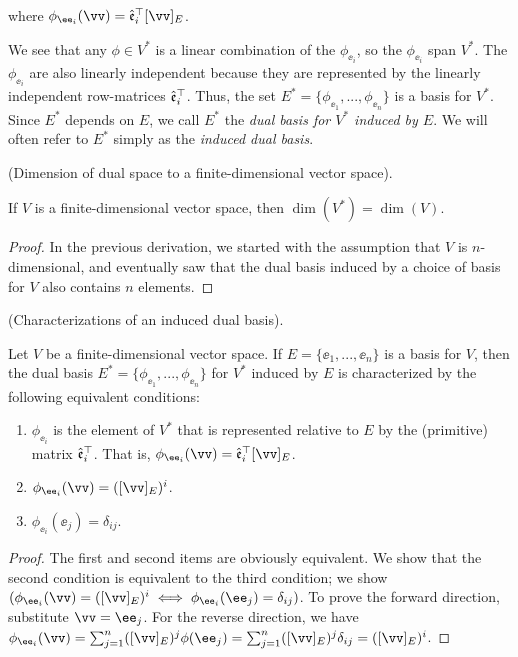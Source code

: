 \begin{deriv}
    where $\phi_{\ee_i}(\vv) = \see_i^\top [\vv]_E$.
    
    We see that any $\phi \in V^*$ is a linear combination of the $\phi_{\ee_i}$, so the $\phi_{\ee_i}$ span $V^*$. The $\phi_{\ee_i}$ are also linearly independent because they are represented by the linearly independent row-matrices $\hat{\mathfrak{e}}_i^\top$. Thus, the set ${E^* = \{\phi_{\ee_1}, ..., \phi_{\ee_n}\}}$ is a basis for $V^*$. Since $E^*$ depends on $E$, we call $E^*$ the \textit{dual basis for $V^*$ induced by $E$}. We will often refer to $E^*$ simply as the \textit{induced dual basis}.
\end{deriv}

\begin{theorem}
\label{ch::motivated_intro::deriv::dim_dual_space}
    (Dimension of dual space to a finite-dimensional vector space).
    
    If $V$ is a finite-dimensional vector space, then $\dim(V^*) = \dim(V)$.
\end{theorem}

\begin{proof}
    In the previous derivation, we started with the assumption that $V$ is $n$-dimensional, and eventually saw that the dual basis induced by a choice of basis for $V$ also contains $n$ elements.
\end{proof}

\begin{theorem}
    (Characterizations of an induced dual basis).
     
    Let $V$ be a finite-dimensional vector space. If $E = \{\ee_1, ..., \ee_n\}$ is a basis for $V$, then the dual basis $E^* = \{\phi_{\ee_1}, ..., \phi_{\ee_n}\}$ for $V^*$ induced by $E$ is characterized by the following equivalent conditions:
             
    \begin{enumerate}
        \item $\phi_{\ee_i}$ is the element of $V^*$ that is represented relative to $E$ by the (primitive) matrix $\hat{\mathfrak{e}}_i^\top$. That is, $\phi_{\ee_i}(\vv) = \see_i^\top [\vv]_E$.
        \item $\phi_{\ee_i}(\vv) = ([\vv]_E)^i$.
        \item $\phi_{\ee_i}(\ee_j) = \delta_{ij}$.
    \end{enumerate}
\end{theorem}

\begin{proof}
    The first and second items are obviously equivalent. We show that the second condition is equivalent to the third condition; we show $(\phi_{\ee_i}(\vv) = ([\vv]_E)^i \iff \phi_{\ee_i}(\ee_j) = \delta_{ij})$. To prove the forward direction, substitute $\vv = \ee_j$. For the reverse direction, we have $\phi_{\ee_i}(\vv) = \sum_{j = 1}^n ([\vv]_E)^j \phi(\ee_j) = \sum_{j = 1}^n ([\vv]_E)^j \delta_{ij} = ([\vv]_E)^i$.
\end{proof}

